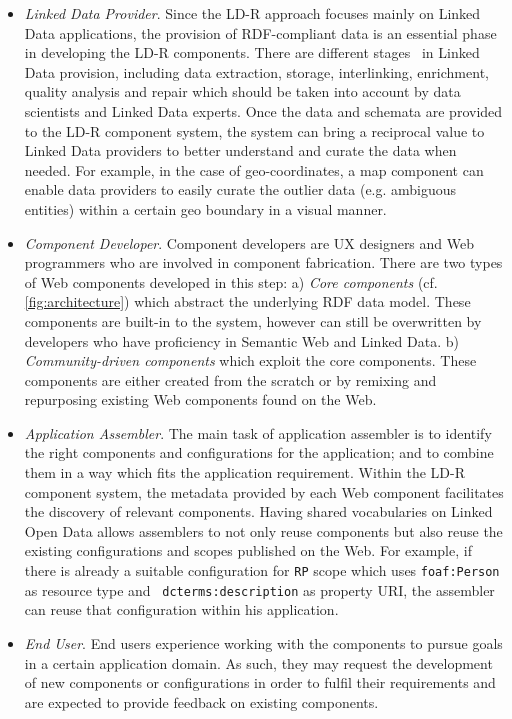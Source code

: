 \documentclass{acm_proc_article-sp}
\begin{document}
\begin{itemize}

\item \emph{Linked Data Provider}.
Since the LD-R approach focuses mainly on Linked Data applications, the provision of RDF-compliant data is an essential phase in developing the LD-R components.
There are different stages~\cite{AuerLOD2} in Linked Data provision, including data extraction, storage, interlinking, enrichment, quality analysis and repair which should be taken into account by data scientists and Linked Data experts.
Once the data and schemata are provided to the LD-R component system, the system can bring a reciprocal value to Linked Data providers to better understand and curate the data when needed.
For example, in the case of geo-coordinates, a map component can enable data providers to easily curate the outlier data (e.g. ambiguous entities) within a certain geo boundary in a visual manner.

\item \emph{Component Developer}. 
Component developers are UX designers and Web programmers who are involved in component fabrication.
There are two types of Web components developed in this step:
a) \emph{Core components} (cf. \autoref{fig:architecture}) which abstract the underlying RDF data model.
These components are built-in to the system, however can still be overwritten by developers who have proficiency in Semantic Web and Linked Data.
b) \emph{Community-driven components} which exploit the core components.
These components are either created from the scratch or by remixing and repurposing existing Web components found on the Web.

\item \emph{Application Assembler}.
The main task of application assembler is to identify the right components and configurations for the application; and to combine them in a way which fits the application requirement. 
Within the LD-R component system, the metadata provided by each Web component facilitates the discovery of relevant components.
Having shared vocabularies on Linked Open Data allows assemblers to not only reuse components but also reuse the existing configurations and scopes published on the Web.
For example, if there is already a suitable configuration for \texttt{RP} scope which uses \texttt{foaf:Person} as resource type and ~\texttt{dcterms:description} as property URI, the assembler can reuse that configuration within his application.

\item \emph{End User}. 
End users experience working with the components to pursue goals in a certain application domain.
As such, they may request the development of new components or configurations in order to fulfil their requirements and are expected to provide feedback on existing components.

\end{itemize}
\end{document}
